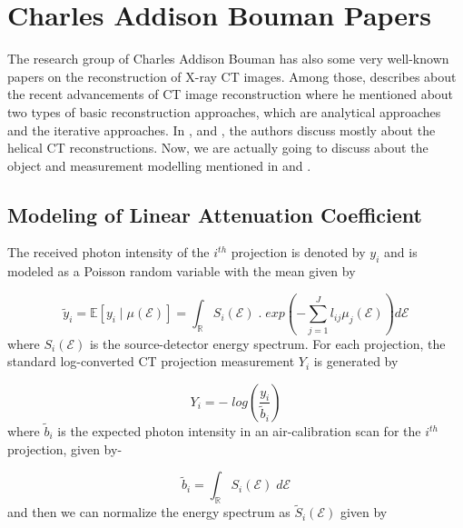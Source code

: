 \section{Charles Addison Bouman Papers}

The research group of Charles Addison Bouman has also some very well-known papers on the reconstruction of X-ray CT images. Among those, \cite{hsieh2013recent} describes about the recent advancements of CT image reconstruction where he mentioned about two types of basic reconstruction approaches, which are analytical approaches and the iterative approaches. In \cite{thibault2007three}, \cite{yu2011fast} and \cite{venkatakrishnan2016phantom}, the authors discuss mostly about the helical CT reconstructions. Now, we are actually going to discuss about the object and measurement modelling mentioned in \cite{jin2015model} and \cite{zhang2014model}.

\subsection{Modeling of Linear Attenuation Coefficient}

The received photon intensity of the $i^{th}$ projection is denoted by $y_{i}$ and is modeled as a Poisson random variable with the mean given by

\begin{equation}
\label{eq15}
\widetilde{y}_{i} = \mathbb{E} \left[ y_i\mid\mu(\mathcal{E}) \right] = \int_{\mathbb{R}} S_i(\mathcal{E}) \; . \; exp \left( - \sum\limits_{j=1}^J l_{ij} \mu_j(\mathcal{E}) \right) d\mathcal{E}
\end{equation} where $S_i(\mathcal{E})$ is the source-detector energy spectrum. For each projection, the standard log-converted CT projection \cite{nuyts2013modelling} measurement $Y_i$ is generated by

\begin{equation}
\label{eq16}
Y_i = - \; log \left( \frac{y_i}{\widetilde{b}_{i}} \right) 
\end{equation} where $\widetilde{b}_{i}$ is the expected photon intensity in an air-calibration scan for the $i^{th}$ projection, given by-


\begin{equation}
\label{eq17}
\widetilde{b}_{i} = \int_{\mathbb{R}} S_i(\mathcal{E}) \; d\mathcal{E}
\end{equation} and then we can normalize the energy spectrum as $\widetilde{S}_{i}(\mathcal{E})$ given by

